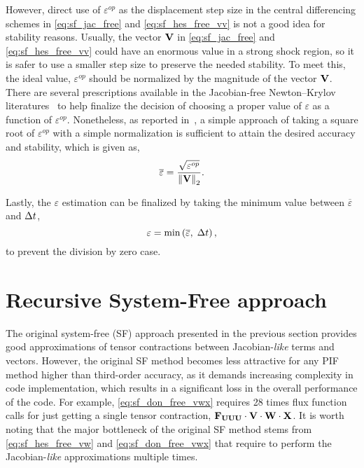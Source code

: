 However, direct use of \( \varepsilon^{op} \) as
the displacement step size in the central differencing schemes
in \cref{eq:sf_jac_free} and \cref{eq:sf_hes_free_vv}
is not a good idea for stability reasons.
%
Usually, the vector \( \mathbf{V} \) in
\cref{eq:sf_jac_free} and \cref{eq:sf_hes_free_vv} could have an
enormous value in a strong shock region, so it is safer to use
a smaller step size to preserve the needed stability. To meet this,
the ideal value, \( \varepsilon^{op} \) should be normalized
by the magnitude of the vector \( \mathbf{V} \).
%
There are several prescriptions available
in the Jacobian-free Newton–Krylov 
literatures~\cite{knoll2004jacobian, brown1990hybrid}
to help finalize the decision of choosing a proper value of \( \varepsilon \)
as a function of  \( \varepsilon^{op} \).
%
Nonetheless, as reported in~\cite{lee2021single},
a simple approach of
taking a square root of \( \varepsilon^{op} \)
with a simple normalization is sufficient to attain the desired accuracy and stability,
which is given as,
%
\begin{equation}\label{eq:sf_epsilon_norm}
    \overline{\varepsilon} = \frac{\sqrt{\varepsilon^{op}}}{\left\lVert \mathbf{V} \right\rVert_{2}}.
\end{equation}

Lastly,
the \( \varepsilon \) estimation can be finalized
by taking the minimum value between $\overline{\varepsilon}$ and $\Delta t$,
%
\begin{equation}\label{eq:sf_epsilon_min_dt}
    \varepsilon = \min \left( \overline{\varepsilon}, \; \Delta t  \right),
\end{equation}
to prevent the division by zero case.


\section{Recursive System-Free approach}\label{sec:recursive_sf}

The original system-free (SF) approach presented in the previous section
provides good approximations of tensor contractions between Jacobian-\textit{like} terms and vectors.
However, the original SF method becomes less attractive for
any PIF method higher than third-order accuracy,
as it demands increasing complexity in code implementation,
which results in a significant loss in the overall performance of the code.
For example, \cref{eq:sf_don_free_vwx} requires 28 times flux function calls
for just getting a single tensor contraction, \( \mathbf{F}_{\mathbf{U}\mathbf{U}\mathbf{U}} \cdot \mathbf{V} \cdot \mathbf{W} \cdot \mathbf{X} \).
It is worth noting that the major bottleneck of the original SF method
stems from \cref{eq:sf_hes_free_vw} and \cref{eq:sf_don_free_vwx}
that require to perform the Jacobian-\textit{like} approximations multiple times.

